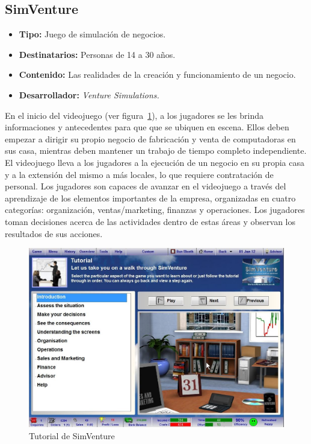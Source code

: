 \subsection{SimVenture}

\begin{itemize}
\item \textbf{Tipo:} Juego de simulación de negocios.
\item \textbf{Destinatarios:} Personas de 14 a 30 años.
\item \textbf{Contenido:} Las realidades de la creación y funcionamiento de un
    negocio.
\item \textbf{Desarrollador:} \emph{Venture Simulations.}
\end{itemize}

En el inicio del videojuego (ver figura~\ref{fig:simventure_tutorial}), a los jugadores se
les brinda informaciones y antecedentes para que que se ubiquen en escena. Ellos
deben empezar a dirigir su propio negocio de fabricación y venta de
computadoras en sus casa, mientras deben mantener un trabajo de tiempo completo
independiente. El videojuego lleva a los jugadores a la ejecución de un negocio en su
propia casa y a la extensión del mismo a más locales, lo que requiere
contratación de personal. Los jugadores son capaces de avanzar en el videojuego a
través del aprendizaje de los elementos importantes de la empresa, organizadas
en cuatro categorías: organización, ventas/marketing, finanzas y operaciones.
Los jugadores toman decisiones acerca de las actividades dentro de estas áreas y
observan los resultados de sus acciones. 

\begin{figure}[ht!]
\centering 
\includegraphics[scale=0.5]{tics/images/simventure-tutorial.jpg}
\caption{Tutorial de SimVenture}
\label{fig:simventure_tutorial}
\end{figure}

